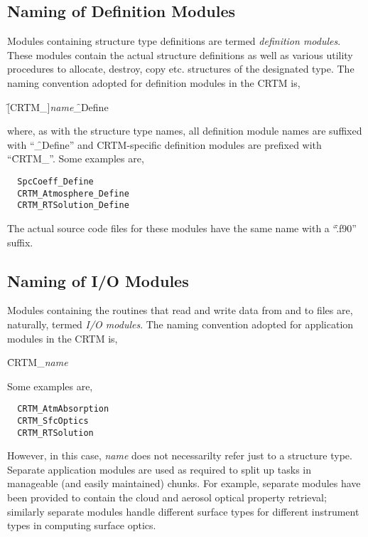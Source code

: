 \subsection{Naming of Definition Modules}
Modules containing structure type definitions are termed \textit{definition modules}. These modules contain the actual structure definitions as well as various utility procedures to allocate, destroy, copy etc. structures of the designated type. The naming convention adopted for definition modules in the CRTM is, 

\hspace{0.5cm}\f{[CRTM\_]}\textit{name}\f{\_Define} 

where, as with the structure type names, all definition module names are suffixed with ``\f{\_Define}'' and CRTM-specific definition modules are prefixed with ``\f{CRTM\_}''. Some examples are,
\begin{ttfamily}
  \begin{verbatim}
  SpcCoeff_Define
  CRTM_Atmosphere_Define
  CRTM_RTSolution_Define\end{verbatim}
\end{ttfamily}
The actual source code files for these modules have the same name with a ``\f{.f90}'' suffix.

\subsection{Naming of I/O Modules}
Modules containing the routines that read and write data from and to files are, naturally, termed \textit{I/O modules}. The naming convention adopted for application modules in the CRTM is, 

\hspace{0.5cm}\f{CRTM\_}\textit{name}

Some examples are,
\begin{ttfamily}
  \begin{verbatim}
  CRTM_AtmAbsorption
  CRTM_SfcOptics
  CRTM_RTSolution\end{verbatim}
\end{ttfamily}
However, in this case, \textit{name} does not necessarilty refer just to a structure type. Separate application modules are used as required to split up tasks in manageable (and easily maintained) chunks. For example, separate modules have been provided to contain the cloud and aerosol optical property retrieval; similarly separate modules handle different surface types for different instrument types in computing surface optics.

